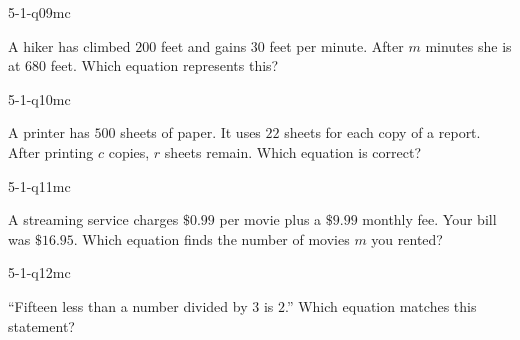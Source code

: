 \begin{practiceQuestion}{5-1-q09}{mc}
\begin{questionText}
A hiker has climbed $200$ feet and gains $30$ feet per minute. After $m$ minutes she is at $680$ feet. Which equation represents this?
\end{questionText}
\end{practiceQuestion}

\begin{practiceQuestion}{5-1-q10}{mc}
\begin{questionText}
A printer has $500$ sheets of paper. It uses $22$ sheets for each copy of a report. After printing $c$ copies, $r$ sheets remain. Which equation is correct?
\end{questionText}
\end{practiceQuestion}

\begin{practiceQuestion}{5-1-q11}{mc}
\begin{questionText}
A streaming service charges $\$0.99$ per movie plus a $\$9.99$ monthly fee. Your bill was $\$16.95$. Which equation finds the number of movies $m$ you rented?
\end{questionText}
\end{practiceQuestion}

\begin{practiceQuestion}{5-1-q12}{mc}
\begin{questionText}
``Fifteen less than a number divided by $3$ is $2$.'' Which equation matches this statement?
\end{questionText}
\end{practiceQuestion}

